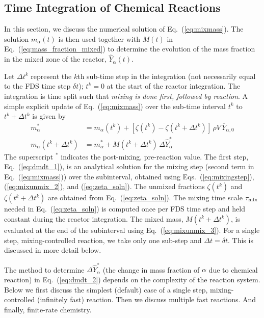 \subsection{Time Integration of Chemical Reactions}
\label{sec:reac_time_integration}

In this section, we discuss the numerical solution of Eq.~(\ref{eq:mixmass}).  The solution $m_\alpha(t)$ is then used together with $M(t)$ in Eq.~(\ref{eq:mass_fraction_mixed}) to determine the evolution of the mass fraction in the mixed zone of the reactor, $\hat{Y}_\alpha(t)$.

Let $\Delta t^k$ represent the $k$th sub-time step in the integration (not necessarily equal to the FDS time step $\delta t$); $t^k=0$ at the start of the reactor integration.  The integration is time split such that \emph{mixing is done first, followed by reaction}. A simple explicit update of Eq.~(\ref{eq:mixmass}) over the sub-time interval $t^k$ to $t^k + \Delta t^k$ is given by
\begin{align}
\label{eq:dmdt_1} m_\alpha^* &= m_{\alpha}(t^k) + [ \zeta(t^k) - \zeta(t^k+\Delta t^k) ] \, \rho V \, \overline{Y}_{\alpha,0}  \\
\label{eq:dmdt_2} m_\alpha(t^k + \Delta t^k) &= m_{\alpha}^* + M(t^k + \Delta t^k) \, \Delta \hat{Y}_\alpha^*
\end{align}
The superscript $^*$ indicates the post-mixing, pre-reaction value.  The first step, Eq.~(\ref{eq:dmdt_1}), is an analytical solution for the mixing step (second term in Eq.~(\ref{eq:mixmass})) over the subinterval, obtained using Eqs.~(\ref{eq:mixingstep}), (\ref{eq:mixunmix_2}), and (\ref{eq:zeta_soln}).  The unmixed fractions $\zeta(t^k)$ and $\zeta(t^k + \Delta t^k)$ are obtained from Eq.~(\ref{eq:zeta_soln}). The mixing time scale $\tau_{\rm mix}$ needed in Eq.~(\ref{eq:zeta_soln}) is computed once per FDS time step and held constant during the reactor integration. The mixed mass, $M(t^k + \Delta t^k)$, is evaluated at the end of the subinterval using Eq.~(\ref{eq:mixunmix_3}). For a single step, mixing-controlled reaction, we take only one sub-step and $\Delta t = \delta t$.  This is discussed in more detail below.  

The method to determine $\Delta \hat{Y}_\alpha^*$ (the change in mass fraction of $\alpha$ due to chemical reaction) in Eq.~(\ref{eq:dmdt_2}) depends on the complexity of the reaction system.  Below we first discuss the simplest (default) case of a single step, mixing-controlled (infinitely fast) reaction.  Then we discuss multiple fast reactions.  And finally, finite-rate chemistry.


